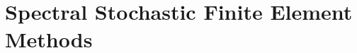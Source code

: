 \documentclass[letter,1p,11pt,oneside,onecolumn,sort&compress]{elsarticle}
\begin{document}




\section{Spectral Stochastic Finite Element Methods}\label{sec:SSFEM}
\end{document}
